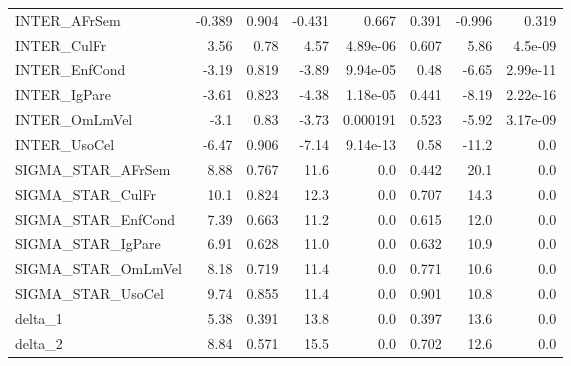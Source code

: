 \begin{tabular}{lrrrrrrr}
INTER\_AFrSem       &  -0.389 &    0.904 &  -0.431 &    0.667 &         0.391 &       -0.996 &         0.319 \\
INTER\_CulFr        &    3.56 &     0.78 &    4.57 & 4.89e-06 &         0.607 &         5.86 &       4.5e-09 \\
INTER\_EnfCond      &   -3.19 &    0.819 &   -3.89 & 9.94e-05 &          0.48 &        -6.65 &      2.99e-11 \\
INTER\_IgPare       &   -3.61 &    0.823 &   -4.38 & 1.18e-05 &         0.441 &        -8.19 &      2.22e-16 \\
INTER\_OmLmVel      &    -3.1 &     0.83 &   -3.73 & 0.000191 &         0.523 &        -5.92 &      3.17e-09 \\
INTER\_UsoCel       &   -6.47 &    0.906 &   -7.14 & 9.14e-13 &          0.58 &        -11.2 &           0.0 \\
SIGMA\_STAR\_AFrSem  &    8.88 &    0.767 &    11.6 &      0.0 &         0.442 &         20.1 &           0.0 \\
SIGMA\_STAR\_CulFr   &    10.1 &    0.824 &    12.3 &      0.0 &         0.707 &         14.3 &           0.0 \\
SIGMA\_STAR\_EnfCond &    7.39 &    0.663 &    11.2 &      0.0 &         0.615 &         12.0 &           0.0 \\
SIGMA\_STAR\_IgPare  &    6.91 &    0.628 &    11.0 &      0.0 &         0.632 &         10.9 &           0.0 \\
SIGMA\_STAR\_OmLmVel &    8.18 &    0.719 &    11.4 &      0.0 &         0.771 &         10.6 &           0.0 \\
SIGMA\_STAR\_UsoCel  &    9.74 &    0.855 &    11.4 &      0.0 &         0.901 &         10.8 &           0.0 \\
delta\_1            &    5.38 &    0.391 &    13.8 &      0.0 &         0.397 &         13.6 &           0.0 \\
delta\_2            &    8.84 &    0.571 &    15.5 &      0.0 &         0.702 &         12.6 &           0.0 \\
\bottomrule
\end{tabular}

